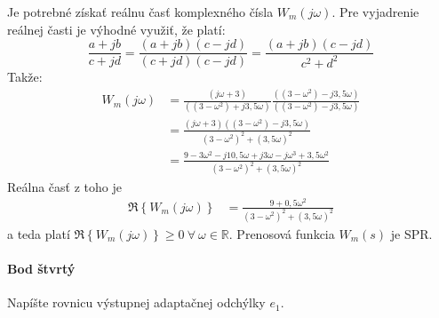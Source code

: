 \documentclass[a4paper, 10pt, ]{article}
\begin{document}
Je potrebné získať reálnu časť komplexného čísla $W_m(j\omega)$. Pre vyjadrenie reálnej časti je výhodné využiť, že platí:
\begin{equation*}
	\frac{a + jb}{c + jd} = \frac{(a + jb) (c - jd)}{(c + jd) (c - jd)} = \frac{(a + jb) (c - jd)}{c^2 + d^2}
\end{equation*}
Takže:
\begin{subequations}
    \begin{align}
        W_m(j\omega) &=
        \frac{ \left( j\omega + 3 \right)}{ \left( \left(3 - \omega^2\right) + j 3,5 \omega \right) }
        \frac{ \left( \left(3 - \omega^2\right) - j 3,5 \omega \right)}{ \left( \left(3 - \omega^2\right) - j 3,5 \omega \right) }
        \\ & =
        \frac{ \left( j\omega + 3 \right) \left( \left(3 - \omega^2\right) - j 3,5 \omega \right)}{ \left(3 - \omega^2\right)^2 + \left(3,5 \omega \right)^2 }
        \\ & =
        \frac{ 9 - 3 \omega^2 - j 10,5 \omega + j 3 \omega - j \omega^3 + 3,5 \omega^2  }{ \left(3 - \omega^2\right)^2 + \left(3,5 \omega \right)^2 }
    \end{align}
\end{subequations}
Reálna časť z toho je
\begin{align}
    \Re \left\{ W_m(j\omega) \right\}
    & =
    \frac{ 9 + 0,5 \omega^2 }{ \left(3 - \omega^2\right)^2 + \left(3,5 \omega \right)^2 }
\end{align}
a teda platí $\Re \left\{ W_m(j\omega) \right\} \geq 0 \  \forall \  \omega \in \mathbb R$.
Prenosová funkcia $W_m(s)$ je SPR.









\paragraph{Bod štvrtý}

\smallskip

{\color{gray}

Napíšte rovnicu výstupnej adaptačnej odchýlky $e_1$.

}

\smallskip
\end{document}
